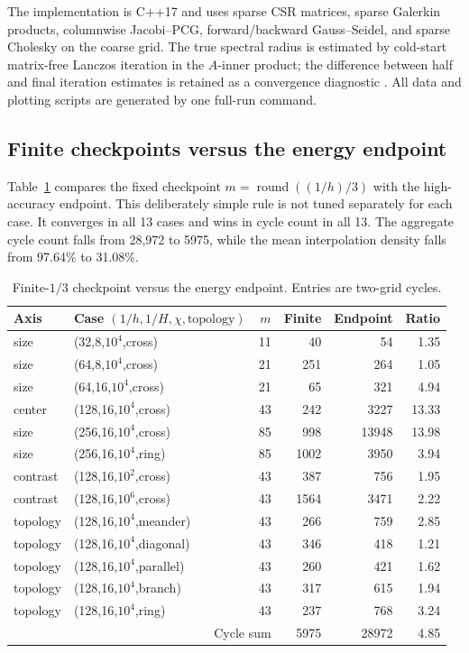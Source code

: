 \documentclass[smallextended]{svjour3}
\begin{document}
The implementation is C++17 and uses sparse CSR matrices, sparse Galerkin products, columnwise Jacobi--PCG, forward/backward Gauss--Seidel, and sparse Cholesky on the coarse grid. The true spectral radius is estimated by cold-start matrix-free Lanczos iteration in the $A$-inner product; the difference between half and final iteration estimates is retained as a convergence diagnostic \cite{bai2000templates}. All data and plotting scripts are generated by one full-run command.

\subsection{Finite checkpoints versus the energy endpoint}
Table~\ref{tab:main} compares the fixed checkpoint $m=\operatorname{round}((1/h)/3)$ with the high-accuracy endpoint. This deliberately simple rule is not tuned separately for each case. It converges in all 13 cases and wins in cycle count in all 13. The aggregate cycle count falls from 28,972 to 5975, while the mean interpolation density falls from 97.64\% to 31.08\%.

\begin{table}[t]
\caption{Finite-$1/3$ checkpoint versus the energy endpoint. Entries are two-grid cycles.}\label{tab:main}
\centering\small
\begin{tabular}{llrrrr}
\toprule
Axis & Case $(1/h,1/H,\chi,\text{topology})$ & $m$ & Finite & Endpoint & Ratio\\
\midrule
size &(32,8,$10^4$,cross)&11&40&54&1.35\\
size &(64,8,$10^4$,cross)&21&251&264&1.05\\
size &(64,16,$10^4$,cross)&21&65&321&4.94\\
center &(128,16,$10^4$,cross)&43&242&3227&13.33\\
size &(256,16,$10^4$,cross)&85&998&13948&13.98\\
size &(256,16,$10^4$,ring)&85&1002&3950&3.94\\
contrast &(128,16,$10^2$,cross)&43&387&756&1.95\\
contrast &(128,16,$10^6$,cross)&43&1564&3471&2.22\\
topology &(128,16,$10^4$,meander)&43&266&759&2.85\\
topology &(128,16,$10^4$,diagonal)&43&346&418&1.21\\
topology &(128,16,$10^4$,parallel)&43&260&421&1.62\\
topology &(128,16,$10^4$,branch)&43&317&615&1.94\\
topology &(128,16,$10^4$,ring)&43&237&768&3.24\\
\midrule
\multicolumn{3}{r}{Cycle sum}&5975&28972&4.85\\
\bottomrule
\end{tabular}
\end{table}
\end{document}
